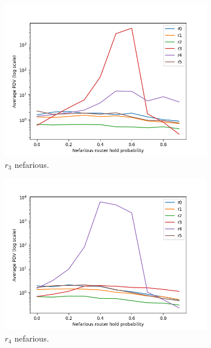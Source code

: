 \begin{figure}[H]
\begin{subfigure}{0.475\textwidth}
        \includegraphics[width=\textwidth]{figs/results/3_nef.png}
        \caption[]{$r_3$ nefarious.}
    \end{subfigure}
    \begin{subfigure}{0.475\textwidth}
        \includegraphics[width=\textwidth]{figs/results/4_nef.png}
        \caption[]{$r_4$ nefarious.}
    \end{subfigure}
    \hfill
    \centering
    \begin{subfigure}{0.475\textwidth}

\end{subfigure}
\end{figure}

